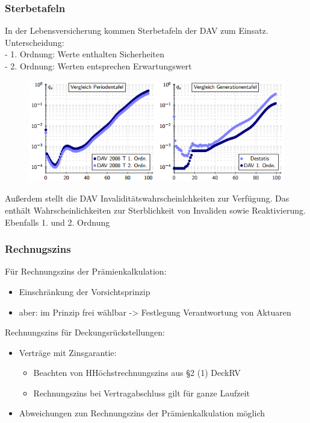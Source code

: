 \documentclass[12pt]{report}
\theoremstyle{dotless}
\theoremstyle{definition}
\begin{document}
\vspace{1cm}
\subsubsection{Sterbetafeln}
In der Lebensversicherung kommen Sterbetafeln der DAV zum Einsatz.\\
Unterscheidung: \\
- 1. Ordnung: Werte enthalten Sicherheiten\\
- 2. Ordnung: Werten entsprechen Erwartungswert

\begin{figure}[ht]
	\centering
	\includegraphics[scale=1]{Bilder/SterbetafelBsp2.png}
\end{figure}
Außerdem stellt die DAV Invaliditätswahrscheinlchkeiten zur Verfügung. Das enthält Wahrscheinlichkeiten zur Sterblichkeit von Invaliden sowie Reaktivierung. Ebenfalls 1. und 2. Ordnung

\subsubsection{Rechnugszins}
Für Rechnungszins der Prämienkalkulation:
\begin{itemize}
\item Einschränkung der Vorsichtsprinzip
\item aber: im Prinzip frei wählbar -> Festlegung Verantwortung von Aktuaren
\end{itemize}
Rechnungszins für Deckungsrückstellungen:
\begin{itemize}
\item Verträge mit Zinsgarantie:
\begin{itemize}
\item Beachten von HHöchstrechnungszins aus §2 (1) DeckRV
\item Rechnungszins bei Vertragabschluss gilt für ganze Laufzeit
\end{itemize}
\item Abweichungen zun Rechnungszins der Prämienkalkulation möglich
\end{itemize}
\end{document}
